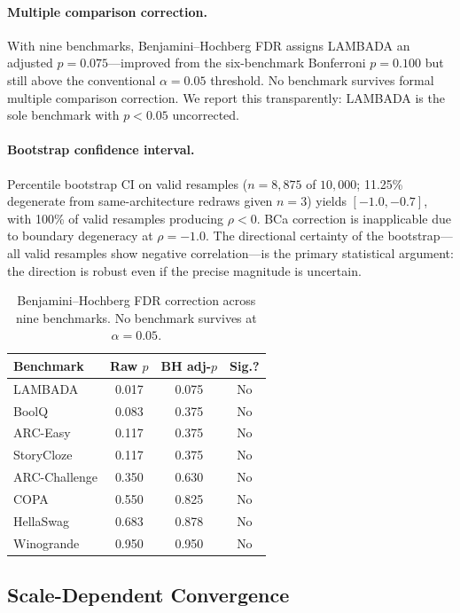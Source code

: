 \documentclass[11pt,twocolumn]{article}
\begin{document}
\paragraph{Multiple comparison correction.}
With nine benchmarks, Benjamini--Hochberg FDR assigns LAMBADA an adjusted $p{=}0.075$---improved from the six-benchmark Bonferroni $p{=}0.100$ but still above the conventional $\alpha{=}0.05$ threshold.
No benchmark survives formal multiple comparison correction.
We report this transparently: LAMBADA is the sole benchmark with $p{<}0.05$ uncorrected.

\paragraph{Bootstrap confidence interval.}
Percentile bootstrap CI \citep{efron1993introduction} on valid resamples ($n{=}8{,}875$ of $10{,}000$; 11.25\% degenerate from same-architecture redraws given $n{=}3$) yields $[-1.0, -0.7]$, with 100\% of valid resamples producing $\rho{<}0$.
BCa correction is inapplicable due to boundary degeneracy at $\rho{=}{-}1.0$.
The directional certainty of the bootstrap---all valid resamples show negative correlation---is the primary statistical argument: the direction is robust even if the precise magnitude is uncertain.

\begin{table}[t]
\centering
\small
\caption{Benjamini--Hochberg FDR correction across nine benchmarks. No benchmark survives at $\alpha{=}0.05$.}\label{tab:fdr}
\begin{tabular}{@{}lccc@{}}
\toprule
\textbf{Benchmark} & \textbf{Raw $p$} & \textbf{BH adj-$p$} & \textbf{Sig.?} \\
\midrule
LAMBADA & 0.017 & 0.075 & No \\
BoolQ & 0.083 & 0.375 & No \\
ARC-Easy & 0.117 & 0.375 & No \\
StoryCloze & 0.117 & 0.375 & No \\
ARC-Challenge & 0.350 & 0.630 & No \\
COPA & 0.550 & 0.825 & No \\
HellaSwag & 0.683 & 0.878 & No \\
Winogrande & 0.950 & 0.950 & No \\
\bottomrule
\end{tabular}
\end{table}


\subsection{Scale-Dependent Convergence}\label{sec:scale-convergence}
\end{document}
